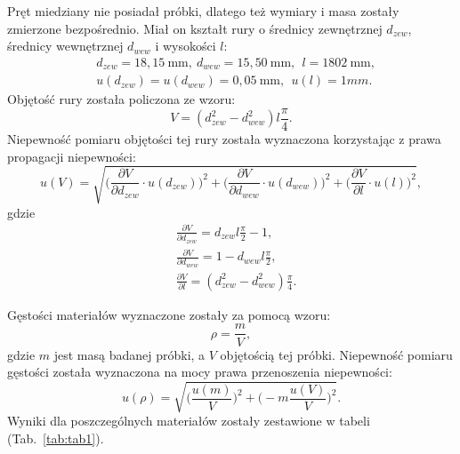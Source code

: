 \documentclass[12pt,a4paper]{article}
\numberwithin{equation}{section}
\begin{document}
Pręt miedziany nie posiadał próbki, dlatego też wymiary i masa zostały zmierzone bezpośrednio. Miał on kształt rury o średnicy zewnętrznej $d_{zew}$, średnicy wewnętrznej $d_{wew}$ i wysokości $l$:
\begin{equation}
	\begin{split}
		&d_{zew} = 18,15~\textrm{mm},~d_{wew} = 15,50~\textrm{mm},~~l = 1802~\textrm{mm},\\
		&u(d_{zew}) = u(d_{wew}) = 0,05~\textrm{mm},~~u(l) = 1mm.
	\end{split}
\end{equation}
Objętość rury została policzona ze wzoru:
\begin{equation}
	V = (d_{zew}^2 - d_{wew}^2) l \frac{\pi }{4}.
\end{equation}
Niepewność pomiaru objętości tej rury została wyznaczona korzystając z prawa propagacji niepewności:
\begin{equation}
	u(V) = \sqrt{\Bigg(\frac{\partial V}{\partial d_{zew}} \cdot u(d_{zew})\Bigg)^2 + \Bigg(\frac{\partial V}{\partial d_{wew}} \cdot u(d_{wew})\Bigg)^2  + \Bigg(\frac{\partial V}{\partial l} \cdot u(l)\Bigg)^2},
\end{equation}
gdzie
\begin{equation}
	\begin{split}
		&\frac{\partial V}{\partial d_{zew}} = d_{zew} l \frac{\pi}{2} - 1,\\[5pt]
		&\frac{\partial V}{\partial d_{wew}} = 1 - d_{wew} l \frac{\pi}{2},\\[5pt]
		&\frac{\partial V}{\partial l} = (d_{zew}^2 - d_{wew}^2) \frac{\pi }{4}.
	\end{split}
\end{equation}

\pagebreak
Gęstości materiałów wyznaczone zostały za pomocą wzoru:
\begin{equation}
	\rho = \frac{m}{V},
\end{equation}
gdzie $m$ jest masą badanej próbki, a $V$ objętością tej próbki.
Niepewność pomiaru gęstości została wyznaczona na mocy prawa przenoszenia niepewności:
\begin{equation}
	u(\rho) = \sqrt{\Bigg(\frac{u(m)}{V}\Bigg)^2 + \Bigg(-m \frac{u(V)}{V}\Bigg)^2}.
\end{equation}
Wyniki dla poszczególnych materiałów zostały zestawione w tabeli \mbox{(Tab. \ref{tab:tab1})}.
\end{document}
